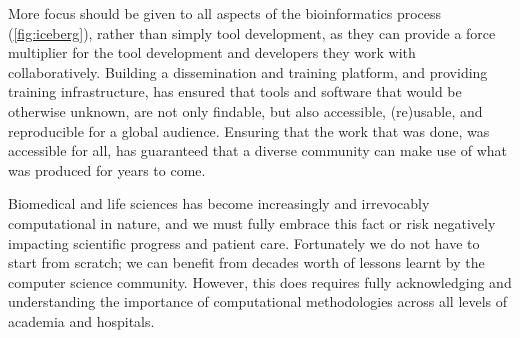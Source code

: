 More focus should be given to all aspects of the bioinformatics process (\cref{fig:iceberg}), rather than simply tool development, as they can provide a force multiplier for the tool development and developers they work with collaboratively.
Building a dissemination and training platform, and providing training infrastructure, has ensured that tools and software that would be otherwise unknown, are not only findable, but also accessible, (re)usable, and reproducible for a global audience. Ensuring that the work that was done, was accessible for all, has guaranteed that a diverse community can make use of what was produced for years to come.

Biomedical and life sciences has become increasingly and irrevocably computational in nature, and we must fully embrace this fact or risk negatively impacting scientific progress and patient care. Fortunately we do not have to start from scratch; we can benefit from decades worth of lessons learnt by the computer science community. However, this does requires fully acknowledging and understanding the importance of computational methodologies across all levels of academia and hospitals.



\footnotesize


\normalsize
